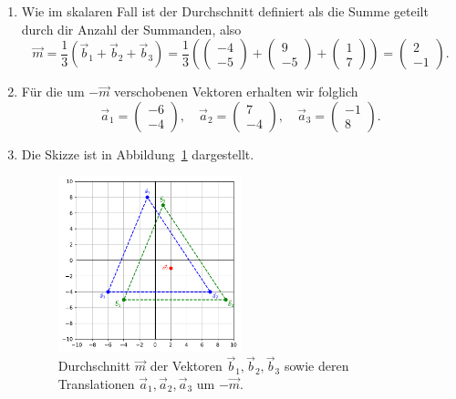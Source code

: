 \begin{losung*}
	\phantom{text}
	\begin{enumerate}[label=(\alph*)]
		\item Wie im skalaren Fall ist der Durchschnitt definiert als die Summe geteilt durch dir Anzahl der Summanden, also
		\begin{equation*}
			\vec{m}=\frac{1}{3}\left(\vec{b}_1+\vec{b}_2+\vec{b}_3\right)
			=\frac{1}{3}\left(
			\begin{pmatrix}
				-4 \\
				-5
			\end{pmatrix}+
			\begin{pmatrix}
				9 \\
				-5
			\end{pmatrix}+
			\begin{pmatrix}
				1 \\
				7
			\end{pmatrix}
			\right)
			=
			\begin{pmatrix}
				2 \\
				-1
			\end{pmatrix}.
		\end{equation*}
		\item Für die um $-\vec{m}$ verschobenen Vektoren erhalten wir folglich
		\begin{equation*}
			\vec{a}_1=
			\begin{pmatrix}
				-6 \\
				-4
			\end{pmatrix},\quad
			\vec{a}_2=
			\begin{pmatrix}
				7 \\
				-4
			\end{pmatrix},\quad
			\vec{a}_3=
			\begin{pmatrix}
				-1 \\
				8
			\end{pmatrix}.
		\end{equation*}
		\item Die Skizze ist in Abbildung~\ref{fig:meanddiff_simple} dargestellt.
		\begin{figure}[ht]
			\centering
			\includegraphics[width=0.5\textwidth]{images/facespace/meandiff_simple}
			\caption{Durchschnitt $\vec{m}$ der Vektoren $\vec{b}_1,\vec{b}_2,\vec{b}_3$ sowie deren Translationen $\vec{a}_1,\vec{a}_2,\vec{a}_3$ um $-\vec{m}$.}
			\label{fig:meanddiff_simple}
		\end{figure}
	\end{enumerate}
\end{losung*}
